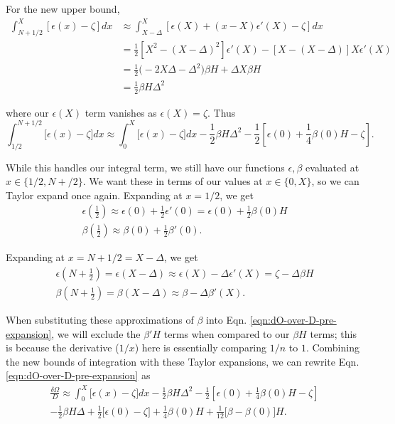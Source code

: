 \documentclass[12pt]{revtex4-2}
\begin{document}
For the new upper bound, 
\begin{align}
    \int_{N+1/2}^{X} [\epsilon(x)-\zeta]dx &\approx \int_{X-\Delta}^{X} [\epsilon(X) + (x-X)\epsilon'(X) - \zeta]dx \\
    &= \frac{1}{2}\left[ X^2 - \left( X-\Delta \right)^2 \right]\epsilon'(X) - \left[X - \left(X-\Delta\right) \right]X\epsilon'(X) \\
    &= \frac{1}{2}\big( -2X\Delta - \Delta^2 \big)\beta H + \Delta X \beta H \\
    &= \frac{1}{2}\beta H \Delta^2
\end{align}

where our $\epsilon(X)$ term vanishes as $\epsilon(X) = \zeta$.  Thus
\begin{equation}
    \int_{1/2}^{N+1/2}\big[\epsilon(x)-\zeta\big]dx \approx \int_0^X \big[\epsilon(x)-\zeta\big]dx - \frac{1}{2}\beta H \Delta^2 - \frac{1}{2}\left[ \epsilon(0) + \frac{1}{4}\beta(0)H - \zeta \right].
\end{equation}

While this handles our integral term, we still have our functions $\epsilon,\beta$ evaluated at $x \in \{1/2,N+/2\}$.  We want these in terms of our values at $x \in \{0,X\}$, so we can Taylor expand once again.  Expanding at $x=1/2$, we get
\begin{gather}
    \epsilon\left( \frac{1}{2} \right) \approx \epsilon(0) + \frac{1}{2}\epsilon'(0) = \epsilon(0) + \frac{1}{2}\beta(0)H \\
    \beta\left( \frac{1}{2} \right) \approx \beta(0) + \frac{1}{2}\beta'(0).
\end{gather}

Expanding at $x = N + 1/2 = X - \Delta$, we get 
\begin{gather}
    \epsilon\left(N + \frac{1}{2}\right) = \epsilon(X-\Delta) \approx \epsilon(X) - \Delta \epsilon'(X) = \zeta - \Delta \beta H \\
    \beta\left(N + \frac{1}{2}\right) = \beta(X-\Delta) \approx \beta - \Delta \beta'(X).
\end{gather}

When substituting these approximations of $\beta$ into Eqn. \ref{eqn:dO-over-D-pre-expansion}, we will exclude the $\beta'H$ terms when compared to our $\beta H$ terms; this is because the derivative ($1/x$) here is essentially comparing $1/n$ to $1$.  Combining the new bounds of integration with these Taylor expansions, we can rewrite Eqn. \ref{eqn:dO-over-D-pre-expansion} as 
\begin{multline}
    \frac{\delta\Omega}{D} \approx \int_0^X \big[\epsilon(x)-\zeta\big]dx  - \frac{1}{2}\beta H \Delta^2 - \frac{1}{2}\left[ \epsilon(0) + \frac{1}{4}\beta(0)H - \zeta \right] \\
     - \frac{1}{2}\beta H\Delta + \frac{1}{2}\big[\epsilon(0)-\zeta\big] + \frac{1}{4}\beta(0)H + \frac{1}{12}\big[ \beta - \beta(0) \big]H.
\end{multline}
\end{document}
